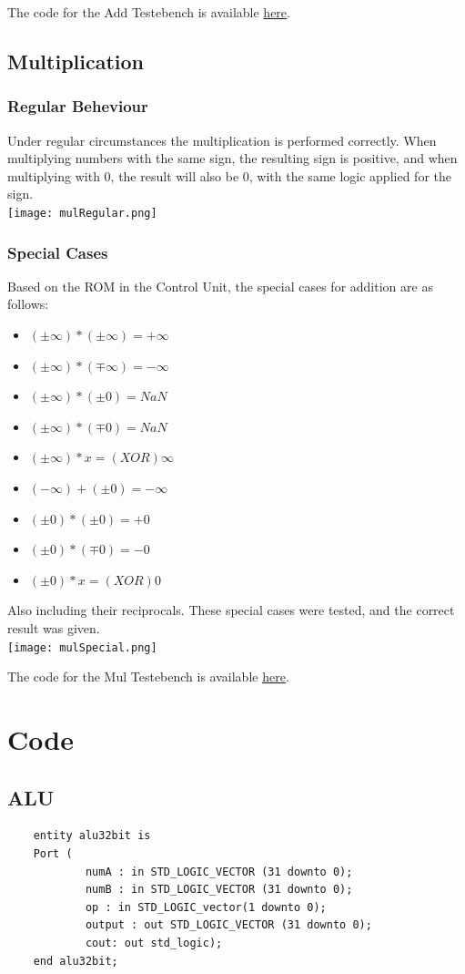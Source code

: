 \documentclass[a4paper,10pt]{article}
\begin{document}
    The code for the Add Testebench is available \hyperref[sec:AddTest]{here}.

    \subsection{Multiplication}
    \subsubsection{Regular Beheviour}
    Under regular circumstances the multiplication is performed correctly. When multiplying numbers with the same sign, the resulting sign is positive, and when multiplying with 0, the result will also be 0, with the same logic applied for the sign.\\
    \texttt{[image: mulRegular.png]}

    \newpage
    \subsubsection{Special Cases}
    Based on the ROM in the Control Unit, the special cases for addition are as follows:
    \begin{itemize}
     \item $(\pm\infty) * (\pm\infty) = +\infty$
     \item $(\pm\infty) * (\mp\infty) = -\infty$
     \item $(\pm\infty) * (\pm0) = NaN$
     \item $(\pm\infty) * (\mp0) = NaN$
     \item $(\pm\infty) * x = (XOR)\infty$
     \item $(-\infty) + (\pm0) = -\infty$
     \item $(\pm0) * (\pm0) = +0$
     \item $(\pm0) * (\mp0) = -0$
     \item $(\pm0) * x = (XOR)0$
    \end{itemize}
    Also including their reciprocals.
    These special cases were tested, and the correct result was given.\\
    \texttt{[image: mulSpecial.png]}

    The code for the Mul Testebench is available \hyperref[sec:MulTest]{here}.
    \newpage
    \section{Code}
    \label{sec:components}
    \subsection{ALU}
    \begin{lstlisting}
    entity alu32bit is
    Port (
            numA : in STD_LOGIC_VECTOR (31 downto 0);
            numB : in STD_LOGIC_VECTOR (31 downto 0);
            op : in STD_LOGIC_vector(1 downto 0);
            output : out STD_LOGIC_VECTOR (31 downto 0);
            cout: out std_logic);
    end alu32bit;
    \end{lstlisting}
\end{document}
